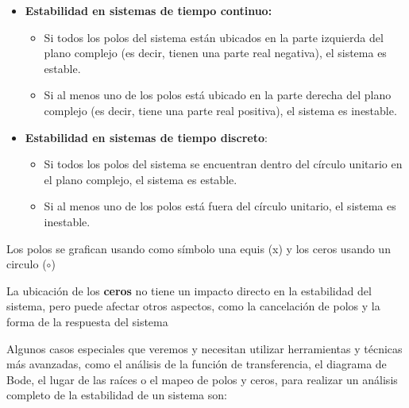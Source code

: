 \documentclass[
	12pt, %
	fleqn, %
	a4paper, %
	oneside, %
]{LegrandOrangeBook}
\begin{document}
\begin{itemize}
\item \textbf{Estabilidad en sistemas de tiempo continuo:}
\begin{itemize}
\item Si todos los polos del sistema están ubicados en la parte izquierda del plano complejo (es decir, tienen una parte real negativa), el sistema es estable.
\item Si al menos uno de los polos está ubicado en la parte derecha del plano complejo (es decir, tiene una parte real positiva), el sistema es inestable.
\end{itemize}
\item \textbf{Estabilidad en sistemas de tiempo discreto}:
\begin{itemize}
\item Si todos los polos del sistema se encuentran dentro del círculo unitario en el plano complejo, el sistema es estable.
\item Si al menos uno de los polos está fuera del círculo unitario, el sistema es inestable.
\end{itemize}
\end{itemize}
\begin{notation}
Los polos se grafican usando como símbolo una equis (x) y los ceros usando un circulo ($\circ$)
\end{notation}
\begin{remark}
La ubicación de los \textbf{ceros} no tiene un impacto directo en la estabilidad del sistema, pero puede afectar otros aspectos, como la cancelación de polos y la forma de la respuesta del sistema
\end{remark}
Algunos casos especiales que veremos y necesitan utilizar herramientas y técnicas más avanzadas, como el análisis de la función de transferencia, el diagrama de Bode, el lugar de las raíces o el mapeo de polos y ceros, para realizar un análisis completo de la estabilidad de un sistema son:
\end{document}
